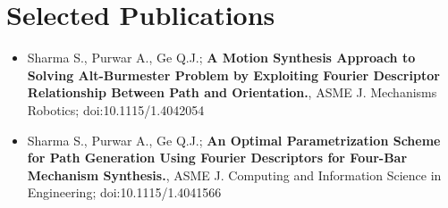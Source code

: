 \documentclass[letterpaper,10pt]{article}
\newcommand{\resumeSection}[1]{
\vspace{-12pt}
\section{\textbf{#1}}
}
\newcommand{\resumeItemListStart}{
\vspace{-7pt}
\begin{itemize}[leftmargin=14pt]
}
\newcommand{\resumeItemListEnd}{
\vspace{+7pt}
\end{itemize}
}
\newcommand{\resumeItem}[1]{
  \item\small{
      {#1 \vspace{-7pt}
      }
  }
}
\begin{document}
    
    
\resumeSection{Selected Publications}
	\vspace{+7pt}
	\resumeItemListStart
	\resumeItem{Sharma S., Purwar A., Ge Q.J.; \textbf{A Motion Synthesis Approach to Solving Alt-Burmester Problem by Exploiting Fourier Descriptor Relationship Between Path and Orientation.}, ASME J. Mechanisms Robotics; doi:10.1115/1.4042054}
	\resumeItem{Sharma S., Purwar A., Ge Q.J.; \textbf{An Optimal Parametrization Scheme for Path Generation Using Fourier Descriptors for Four-Bar Mechanism Synthesis.}, ASME J. Computing and Information Science in Engineering; doi:10.1115/1.4041566}
	\resumeItemListEnd
\end{document}
